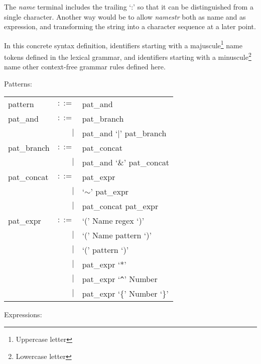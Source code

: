 The \textit{name} terminal includes the trailing `:' so that it can be
distinguished from a single character. Another way would be to allow
\textit{namestr} both as name and as expression, and transforming the string
into a character sequence at a later point.

\begin{defn}
   \label{defn-gram-cfg}

   In this concrete syntax definition, identifiers starting with a
   majuscule\footnote{Uppercase letter} name tokens defined in the lexical
   grammar, and identifiers starting with a minuscule\footnote{Lowercase letter}
   name other context-free grammar rules defined here.

   Patterns:

   \begin{tabular}{lrl}
      pattern		& $::=$	& pat\_and			\\
      pat\_and		& $::=$	& pat\_branch			\\
      			& $|$	& pat\_and `$|$' pat\_branch	\\
      pat\_branch	& $::=$	& pat\_concat			\\
      			& $|$	& pat\_and `\&' pat\_concat	\\
      pat\_concat	& $::=$	& pat\_expr			\\
			& $|$	& `$\sim$' pat\_expr		\\
			& $|$	& pat\_concat pat\_expr		\\
      pat\_expr		& $::=$	& `(' Name regex `)'		\\
			& $|$	& `(' Name pattern `)'		\\
			& $|$	& `(' pattern `)'		\\
			& $|$	& pat\_expr `*'			\\
                        & $|$	& pat\_expr `\verb!^!' Number	\\
                        & $|$	& pat\_expr `\{' Number `\}'	\\
   \end{tabular}

   \needspace{5cm}
   Expressions:


\end{defn}
